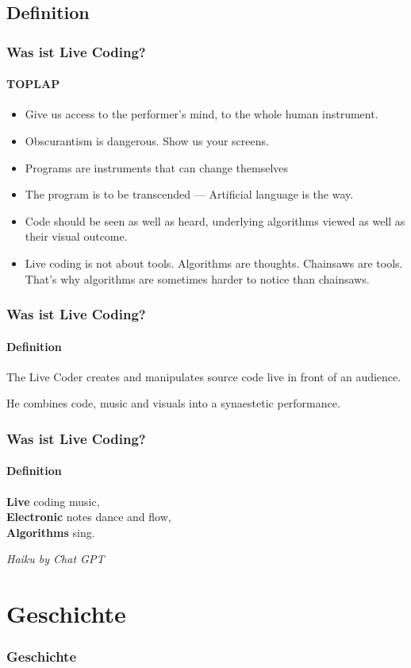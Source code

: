 \documentclass{beamer}
\begin{document}
\subsection{Definition}
\begin{frame}
  \frametitle{Was ist Live Coding?}
  \framesubtitle{TOPLAP}
  \small
  \begin{itemize}
    \item Give us access to the performer's mind, to the whole human instrument.
    \item Obscurantism is dangerous. Show us your screens.
    \item Programs are instruments that can change themselves
    \item The program is to be transcended --- Artificial language is the way.
    \item Code should be seen as well as heard, underlying algorithms viewed as well as their visual outcome.
    \item Live coding is not about tools. Algorithms are thoughts. Chainsaws are tools. That's why algorithms are sometimes harder to notice than chainsaws.
  \end{itemize}
\end{frame}

\begin{frame}
  \frametitle{Was ist Live Coding?}
  \framesubtitle{Definition}
  The Live Coder creates and manipulates source code live in front of an audience.

  \vspace{1ex}
  He combines code, music and visuals into a synaestetic performance.
\end{frame}

\begin{frame}
  \frametitle{Was ist Live Coding?}
  \framesubtitle{Definition}
  \renewcommand{\epigraphflush}{center}
  \epigraph{
    \textbf{\textcolor{fg}{Live}} coding music, \\
    \textbf{\textcolor{fg}{Electronic}} notes dance and flow, \\
    \textbf{\textcolor{fg}{Algorithms}} sing.
  }{\textcolor{fg}{\textit{Haiku by Chat GPT}}}
\end{frame}

\section{Geschichte}
\begin{frame}
  \frametitle{Geschichte}
\end{frame}
\end{document}
